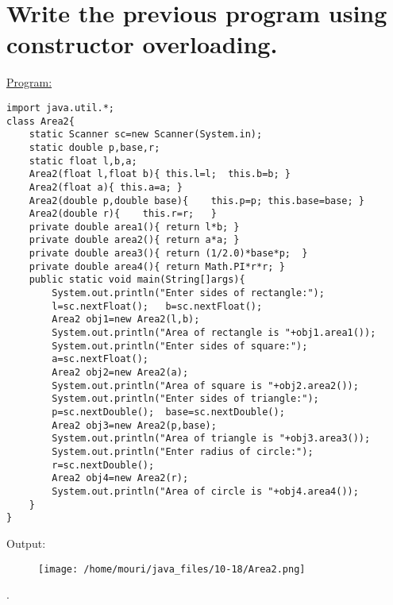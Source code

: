\documentclass[a4paper,11pt]{article}
\begin{document}
\section{Write the previous program using constructor overloading.}
\underline{Program:}
\begin{lstlisting}[showstringspaces=false]
import java.util.*;
class Area2{
	static Scanner sc=new Scanner(System.in);
	static double p,base,r;
	static float l,b,a;
	Area2(float l,float b){	this.l=l;  this.b=b; }
	Area2(float a){	this.a=a; }
	Area2(double p,double base){	this.p=p; this.base=base; }
	Area2(double r){	this.r=r;	}
	private double area1(){	return l*b;	}
	private double area2(){	return a*a;	}
	private double area3(){	return (1/2.0)*base*p;	}
	private double area4(){	return Math.PI*r*r;	}
	public static void main(String[]args){
		System.out.println("Enter sides of rectangle:");
		l=sc.nextFloat();	b=sc.nextFloat();
		Area2 obj1=new Area2(l,b);
		System.out.println("Area of rectangle is "+obj1.area1());
		System.out.println("Enter sides of square:");
		a=sc.nextFloat();
		Area2 obj2=new Area2(a);
		System.out.println("Area of square is "+obj2.area2());
		System.out.println("Enter sides of triangle:");
		p=sc.nextDouble();	base=sc.nextDouble();
		Area2 obj3=new Area2(p,base);
		System.out.println("Area of triangle is "+obj3.area3());
		System.out.println("Enter radius of circle:");
		r=sc.nextDouble();
		Area2 obj4=new Area2(r);
		System.out.println("Area of circle is "+obj4.area4());
	}
}
\end{lstlisting}
Output:
\begin{figure}[H]
\centering
\texttt{[image: /home/mouri/java\_files/10-18/Area2.png]}
\end{figure}
.
\end{document}
